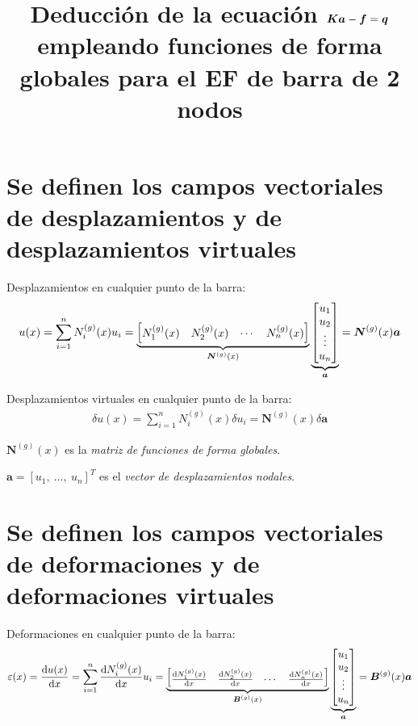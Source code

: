 \documentclass[12pt,letterpaper,landscape]{article}
\title{Deducción de la ecuación $\ma{K}\ve{a} - \ma{f} = \ma{q}$ empleando funciones de forma globales para el EF de barra de 2 nodos}
\date{}
\newcommand{\ve}[1]{{\boldsymbol{#1}}}
\newcommand{\ma}[1]{{\boldsymbol{#1}}}
\newcommand{\dd}{\operatorname{d} \!}
\begin{document}
   \maketitle

\section{Se definen los campos vectoriales de desplazamientos y  de desplazamientos virtuales}

Desplazamientos en cualquier punto de la barra:
\begin{align}
u(x) = \sum_{i=1}^n N_i^{(g)}(x) u_i = 
\underbrace{%
   \begin{bmatrix}
   N_1^{(g)}(x) & N_2^{(g)}(x) & \cdots &N_n^{(g)}(x)
   \end{bmatrix}}_{\ma{N}^{(g)}(x)}
   \underbrace{\begin{bmatrix}
      u_1 \\ u_2 \\ \vdots \\u_n
   \end{bmatrix}%
}_{\ma{a}}
= \ma{N}^{(g)}(x)  \ve{a}
\end{align}

Desplazamientos virtuales en cualquier punto de la barra:
\begin{align}
\delta u(x) = \sum_{i=1}^n N_i^{(g)}(x) \delta u_i = \ma{N}^{(g)}(x) \delta \ve{a}
\end{align}

$\ma{N}^{(g)}(x)$ es la \emph{matriz de funciones de forma globales}.

$\ve{a} = [u_1,\ \ldots, \ u_n]^T$ es el \emph{vector de desplazamientos nodales}.

\newpage

\section{Se definen los campos vectoriales de deformaciones y  de deformaciones virtuales}

Deformaciones  en cualquier punto de la barra:
\begin{align}
\varepsilon(x) = \frac{\dd u(x)}{\dd x} = \sum_{i=1}^n \frac{\dd N_i^{(g)}(x)}{\dd x} u_i = 
\underbrace{%
   \begin{bmatrix}
      \frac{\dd N_1^{(g)}(x)}{\dd x} & 
      \frac{\dd N_2^{(g)}(x)}{\dd x} & 
      \cdots &
      \frac{\dd N_n^{(g)}(x)}{\dd x}
      \end{bmatrix}%
   }_{\ma{B}^{(g)}(x)}
   \underbrace{%
      \begin{bmatrix}
         u_1 \\ u_2 \\ \vdots \\ u_n
      \end{bmatrix}%
   }_{\ma{a}} = 
\ma{B}^{(g)}(x)  \ve{a}
\end{align}
\end{document}
